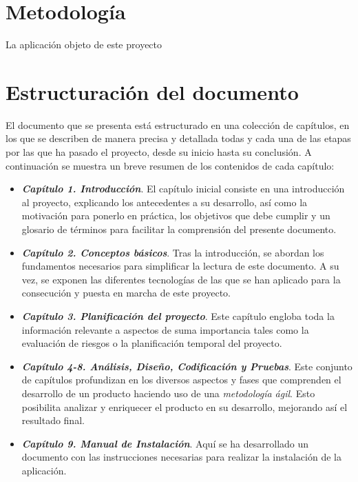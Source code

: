 \section{Metodología}
La aplicación objeto de este proyecto 
\lorem{} %

\section{Estructuración del documento}
El documento que se presenta está estructurado en una colección de capítulos, 
en los que se describen de manera precisa y detallada todas y cada una de 
las etapas por las que ha pasado el proyecto, desde su inicio hasta su 
conclusión. A continuación se muestra un breve resumen de los contenidos 
de cada capítulo:

\begin{itemize}
    \item \textbf{\emph{Capítulo 1. Introducción}}. El capítulo inicial 
    consiste en una introducción al proyecto, explicando los antecedentes 
    a su desarrollo, así como la motivación para ponerlo en práctica, los 
    objetivos que debe cumplir y un glosario de términos para facilitar 
    la comprensión del presente documento.

    \item \textbf{\emph{Capítulo 2. Conceptos básicos}}. Tras la introducción,
    se abordan los fundamentos necesarios para simplificar la lectura de 
    este documento. A su vez, se exponen las diferentes tecnologías de las 
    que se han aplicado para la consecución y puesta en marcha de este 
    proyecto.

    \item \textbf{\emph{Capítulo 3. Planificación del proyecto}}. Este 
    capítulo engloba toda la información relevante a aspectos de 
    suma importancia tales como la evaluación de riesgos o la planificación 
    temporal del proyecto.

    \item \textbf{\emph{Capítulo 4-\@8. Análisis, Diseño, Codificación y 
    Pruebas}}. Este conjunto de capítulos profundizan en los diversos 
    aspectos y fases que comprenden el desarrollo de un producto haciendo 
    uso de una \emph{metodología ágil}. Esto posibilita analizar y 
    enriquecer el producto en su desarrollo, mejorando así el resultado 
    final.

    \item \textbf{\emph{Capítulo 9. Manual de Instalación}}. Aquí se 
    ha desarrollado un documento con las instrucciones necesarias 
    para realizar la instalación de la aplicación.


\end{itemize}
